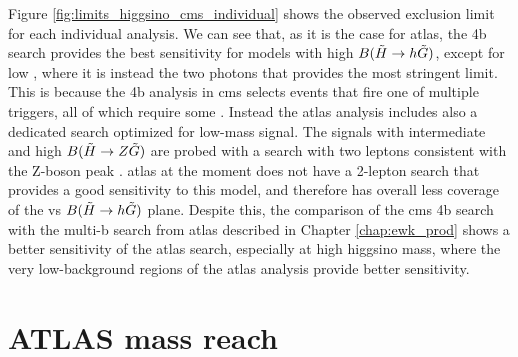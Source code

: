 Figure \ref{fig:limits_higgsino_cms_individual} shows the observed exclusion limit for each individual analysis. 
We can see that, as it is the case for \gls{atlas}, the 4b search \cite{Sirunyan:2017obz} provides the 
best sensitivity for models with high $B(\tilde{H}\rightarrow h \tilde{G})$, except for low \mhino, where 
it is instead the two photons \cite{Sirunyan:2017eie} that provides the most stringent limit.
This is because the 4b analysis in \gls{cms} selects events that fire one of multiple triggers, 
all of which require some \met. 
Instead the \gls{atlas} analysis 
includes also a dedicated search optimized for low-mass signal.
The signals with intermediate and high $B(\tilde{H}\rightarrow Z \tilde{G})$ are probed with a 
search with two leptons consistent with the Z-boson peak \cite{Sirunyan:2017qaj}. 
\gls{atlas} at the moment does not have a 2-lepton search that provides a good sensitivity to this model,
and therefore has overall less coverage of the \mhino vs $B(\tilde{H}\rightarrow h \tilde{G})$ plane.
Despite this, the comparison of the \gls{cms} 4b search with the multi-b search from \gls{atlas}
described in Chapter \ref{chap:ewk_prod} shows a better sensitivity of the \gls{atlas} search, 
especially at high higgsino mass,
where the very low-background regions of the \gls{atlas} analysis provide better sensitivity. 




\FloatBarrier


\section{ATLAS mass reach}


